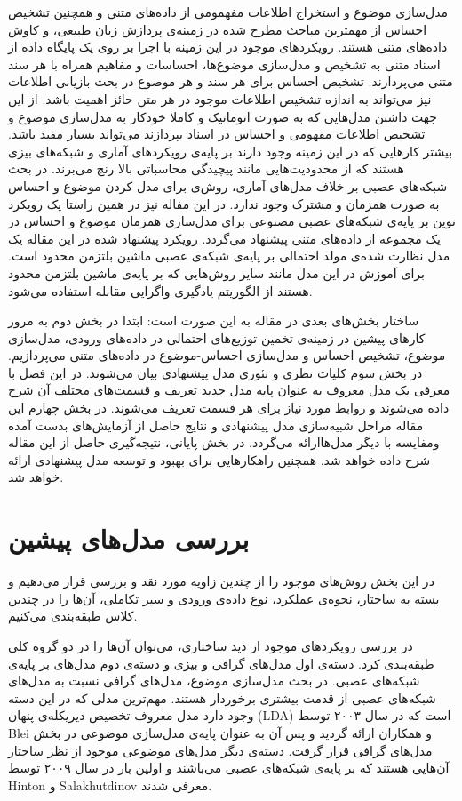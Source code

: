 \documentclass[12pt,a4paper]{article}
\begin{document}
مدل‌سازی موضوع و استخراج اطلاعات مفهمومی از داده‌های متنی و همچنین تشخیص احساس از مهمترین مباحث مطرح شده در زمینه‌ی پردازش زبان طبیعی، و کاوش داده‌های متنی هستند. رویکردهای موجود در این زمینه با اجرا بر روی یک پایگاه داده‌ از اسناد متنی به تشخیص و مدل‌سازی موضوع‌ها، احساسات و مفاهیم همراه با هر سند متنی می‌پردازند. تشخیص احساس برای هر سند و هر موضوع در بحث بازیابی اطلاعات نیز می‌‌تواند به اندازه تشخیص اطلاعات موجود در هر متن حائز اهمیت باشد. از این جهت داشتن مدل‌هایی که به صورت اتوماتیک و کاملا خودکار به مدل‌سازی موضوع و تشخیص اطلاعات مفهومی‌ و احساس در اسناد بپردازند می‌تواند بسیار مفید باشد. بیشتر کارهایی که در این زمینه وجود دارند بر پایه‌ی رویکردهای آماری و شبکه‌های بیزی هستند که از محدودیت‌هایی مانند پیچیدگی محاسباتی بالا رنج می‌برند. در بحث شبکه‌های عصبی بر خلاف مدل‌های آماری، روش‌ی برای مدل کردن موضوع و احساس به صورت همزمان و مشترک وجود ندارد. در این مفاله نیز در همین راستا یک رویکرد نوین‌ بر پایه‌ی شبکه‌های عصبی مصنوعی برای مدل‌سازی همزمان موضوع‌ و احساس‌ در یک مجموعه از داده‌های متنی پیشنهاد می‌گردد. رویکرد پیشنهاد شده در این مقاله یک مدل نظارت شده‌ی مولد احتمالی‌ بر پایه‌ی شبکه‌ی عصبی ماشین بلتزمن محدود است. برای آموزش در این مدل مانند سایر روش‌هایی که بر پایه‌ی ماشین بلتزمن محدود هستند از الگوریتم یادگیری واگرایی مقابله استفاده می‌‌شود.

ساختار بخش‌های بعدی در مقاله به این صورت است: ابتدا در بخش دوم به مرور کارهای پیشین در زمینه‌ی تخمین توزیع‌های احتمالی‌ در داده‌های ورودی، مدل‌سازی موضوع، تشخیص احساس و مدل‌سازی احساس‌-موضوع در داده‌های متنی می‌‌پردازیم. در بخش سوم کلیات نظری و تئوری مدل پیشنهادی بیان می‌‌شوند. در این فصل با معرفی‌ یک مدل معروف به عنوان پایه مدل جدید تعریف و قسمت‌های مختلف آن شرح داده می‌‌شوند و روابط مورد نیاز برای هر قسمت تعریف می‌‌شوند. در بخش چهارم این مقاله مراحل شبیه‌سازی مدل پیشنهادی و نتایج حاصل از آزمایش‌های بدست آمده ومفایسه با دیگر مدل‌هاارائه می‌گردد. در بخش پایانی، نتیجه‌گیری حاصل از این مقاله شرح داده خواهد شد. همچنین راهکارهایی برای بهبود و توسعه مدل پیشنهادی ارائه خواهد شد.

\section{ بررسی مدل‌های پیشین}
\label{sec2}
در این بخش روش‌های موجود را از چندین زاویه مورد نقد و بررسی‌ قرار می‌‌دهیم و بسته به ساختار، نحوه‌ی عملکرد، نوع داده‌ی ورودی و سیر تکاملی، آن‌ها را در چندین کلاس طبقه‌بندی می‌‌کنیم.

در بررسی‌ رویکرد‌های موجود از دید ساختاری، می‌‌توان آن‌ها را در دو گروه کلی‌ طبقه‌بندی کرد. دسته‌ی اول مدل‌های گرافی‌ و بیزی و دسته‌ی دوم 
مدل‌های بر پایه‌ی شبکه‌های عصبی. در بحث مدل‌سازی موضوع، مدل‌های گرافی‌ نسبت به مدل‌های شبکه‌های عصبی از قدمت بیشتری برخوردار هستند.
 مهم‌ترین مدلی‌ که در این دسته وجود دارد مدل معروف تخصیص دیریکله‌ی پنهان (LDA) است که در سال ۲۰۰۳ توسط Blei و همکاران 
ارائه گردید و پس آن به عنوان پایه‌ی مدل‌سازی موضوعی در بخش مدل‌های گرافی قرار گرفت. دسته‌ی دیگر مدل‌های موضوعی موجود از نظر ساختار آن‌هایی
هستند که بر پایه‌ی شبکه‌های عصبی می‌‌باشند و اولین بار در سال ۲۰۰۹ توسط Hinton
و Salakhutdinov معرفی‌ شدند.
\end{document}
